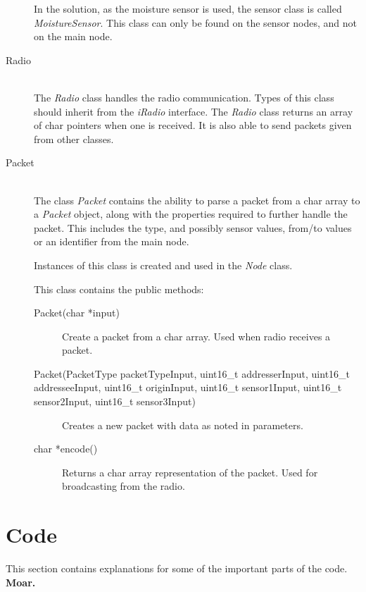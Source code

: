 \begin{description}
In the solution, as the moisture sensor is used, the sensor class is called \textit{MoistureSensor}. This class can only be found on the sensor nodes, and not on the main node.


\item[Radio] \hfill \\
The \textit{Radio} class handles the radio communication. Types of this class should inherit from the \textit{iRadio} interface. The \textit{Radio} class returns an array of char pointers when one is received. It is also able to send packets given from other classes.

\item[Packet] \hfill \\
The class \textit{Packet} contains the ability to parse a packet from a char array to a \textit{Packet} object, along with the properties required to further handle the packet. This includes the type, and possibly sensor values, from/to values or an identifier from the main node.

Instances of this class is created and used in the \textit{Node} class.

This class contains the public methods:
\begin{description}
\item[Packet(char *input)] Create a packet from a char array. Used when radio receives a packet.
\item[Packet(PacketType packetTypeInput, uint16\_t addresserInput, uint16\_t addresseeInput, uint16\_t originInput, uint16\_t sensor1Input, uint16\_t sensor2Input, uint16\_t sensor3Input)] Creates a new packet with data as noted in parameters.
\item[char *encode()] Returns a char array representation of the packet. Used for broadcasting from the radio.
\end{description}

\end{description}


\section{Code}
This section contains explanations for some of the important parts of the code.
\textbf{Moar.}



